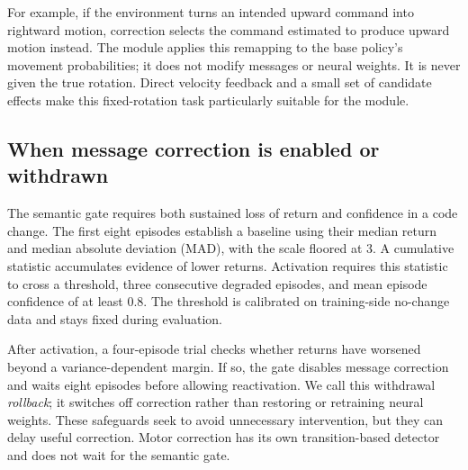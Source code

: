 \documentclass[10pt,a4paper]{article}
\begin{document}
For example, if the environment turns an intended upward command into rightward motion, correction selects the command estimated to produce upward motion instead. The module applies this remapping to the base policy's movement probabilities; it does not modify messages or neural weights. It is never given the true rotation. Direct velocity feedback and a small set of candidate effects make this fixed-rotation task particularly suitable for the module.

\subsection{When message correction is enabled or withdrawn}
The semantic gate requires both sustained loss of return and confidence in a code change. The first eight episodes establish a baseline using their median return and median absolute deviation (MAD), with the scale floored at 3. A cumulative statistic accumulates evidence of lower returns. Activation requires this statistic to cross a threshold, three consecutive degraded episodes, and mean episode confidence of at least $0.8$. The threshold is calibrated on training-side no-change data and stays fixed during evaluation.

After activation, a four-episode trial checks whether returns have worsened beyond a variance-dependent margin. If so, the gate disables message correction and waits eight episodes before allowing reactivation. We call this withdrawal \emph{rollback}; it switches off correction rather than restoring or retraining neural weights. These safeguards seek to avoid unnecessary intervention, but they can delay useful correction. Motor correction has its own transition-based detector and does not wait for the semantic gate.
\end{document}
